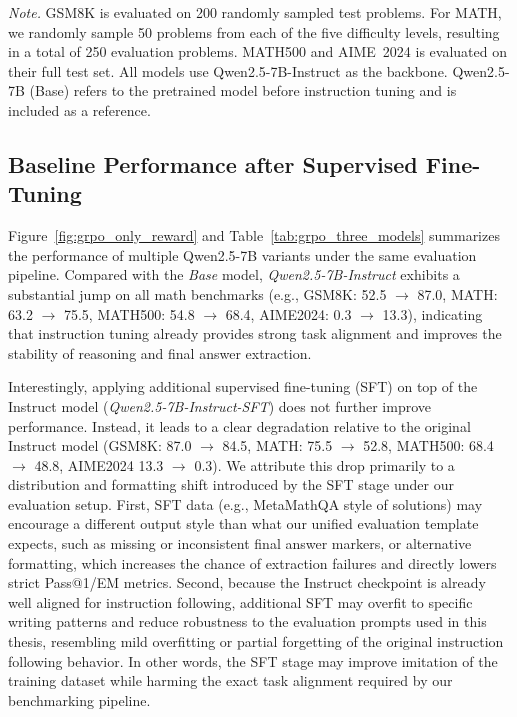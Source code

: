 \documentclass[12pt]{report}
\begin{document}
\begin{table}[t]
\vspace{1mm}
\begin{minipage}{\textwidth}
\footnotesize
    \textit{Note.} GSM8K is evaluated on 200 randomly sampled test problems.
For MATH, we randomly sample 50 problems from each of the five difficulty levels, resulting in a total of 250 evaluation problems.
MATH500 and AIME~2024 is evaluated on their full test set. All models use Qwen2.5-7B-Instruct as the backbone. Qwen2.5-7B (Base) refers to the pretrained model before instruction tuning and is included as a reference.
\end{minipage}
\end{table}

\subsection{Baseline Performance after Supervised Fine-Tuning}
\label{sec:baseline_sft}

Figure~\ref{fig:grpo_only_reward} and Table~\ref{tab:grpo_three_models} summarizes the performance of multiple Qwen2.5-7B variants under
the same evaluation pipeline.
Compared with the \textit{Base} model, \textit{Qwen2.5-7B-Instruct} exhibits a substantial jump on
all math benchmarks (e.g., GSM8K: 52.5 $\rightarrow$ 87.0, MATH: 63.2 $\rightarrow$ 75.5, MATH500:
54.8 $\rightarrow$ 68.4, AIME2024: 0.3 $\rightarrow$ 13.3), indicating that instruction tuning already provides strong task alignment and improves the stability of reasoning and final answer extraction.

Interestingly, applying additional supervised fine-tuning (SFT) on top of the Instruct model
(\textit{Qwen2.5-7B-Instruct-SFT}) does not further improve performance. Instead, it leads to a clear
degradation relative to the original Instruct model (GSM8K: 87.0 $\rightarrow$ 84.5, MATH: 75.5
$\rightarrow$ 52.8, MATH500: 68.4 $\rightarrow$ 48.8, AIME2024 13.3 $\rightarrow$ 0.3). We attribute this drop primarily to a
distribution and formatting shift introduced by the SFT stage under our evaluation setup.
First, SFT data (e.g., MetaMathQA style of solutions\cite{yu2024metamathbootstrapmathematicalquestions}) may encourage a different output style than what our unified evaluation template expects, such as missing or inconsistent final answer markers, or alternative formatting, which
increases the chance of extraction failures and directly lowers strict Pass@1/EM metrics. 
Second, because the Instruct checkpoint is already well aligned for instruction following, additional SFT may overfit to specific writing patterns and reduce robustness to the evaluation prompts used in this thesis, resembling mild overfitting or partial forgetting of the original instruction following behavior.
In other words, the SFT stage may improve imitation
of the training dataset while harming the exact task alignment required by our
benchmarking pipeline.
\end{document}

